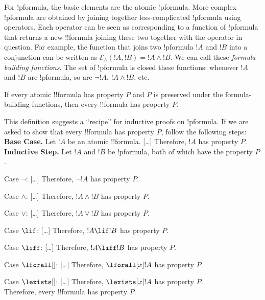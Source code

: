 \documentclass[../../include/open-logic-section]{subfiles}
\begin{document}
\begin{explain}
For !p{formula}, the basic elements are the atomic !p{formula}. More complex !p{formula} 
are obtained by joining together less-complicated !p{formula} using operators. Each 
operator can be seen as corresponding to a function of !p{formula} that returns a new 
!!{formula} joining these two together with the operator in question. For example, the function 
that joins two !p{formula} $!A$ and $!B$ into a conjunction can be written as $\mathcal E _\land 
(!A, !B) = !A \land !B$. We can call these \emph{formula-building functions}. The set of 
!p{formula} is closed these functions: whenever $!A$ and $!B$ are !p{formula}, so are 
$\lnot !A$, $!A \land !B$, etc. 
\end{explain}

\begin{defn}
If every atomic !!{formula} has property $P$ and $P$ is preserved under the formula-building 
functions, then every !!{formula} has property $P$.
\end{defn}

\begin{explain}
This definition suggests a ``recipe'' for inductive proofs on !p{formula}. If we are asked 
to show that every !!{formula} has property $P$, follow the following steps:\\

\textbf{Base Case.} Let $!A$ be an atomic !!{formula}. [\ldots] Therefore, $!A$ has 
property $P$.\\

\textbf{Inductive Step.} Let $!A$ and $!B$ be !p{formula}, both of which have the property $P$.

Case $\lnot$: [\ldots] Therefore, $\lnot !A$ has property $P$.

Case $\land$: [\ldots] Therefore, $!A \land !B$ has property $P$. 

Case $\lor$: [\ldots] Therefore, $!A \lor !B$ has property $P$. 

Case $\lif$: [\ldots] Therefore, $!A \lif !B$ has property $P$.

Case $\liff$: [\ldots] Therefore, $!A \liff !B$ has property $P$.

Case $\lforall[]$: [\ldots] Therefore, $\lforall[x] !A$ has property $P$.

Case $\lexists[]$: [\ldots] Therefore, $\lexists[x] !A$ has property $P$. \\

Therefore, every !!{formula} has property $P$.
\end{explain}
\end{document}
